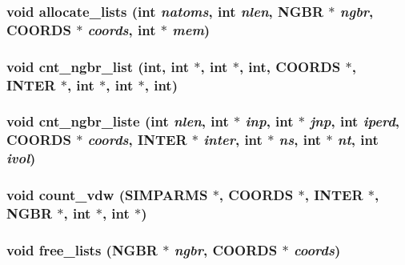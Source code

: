 \subsubsection{\setlength{\rightskip}{0pt plus 5cm}void allocate\_\-lists (int {\em natoms}, int {\em nlen}, {\bf NGBR} $\ast$ {\em ngbr}, {\bf COORDS} $\ast$ {\em coords}, int $\ast$ {\em mem})}\label{ngbr__list_8c_8540220cab7e209c3a9f81f034bc582f}


\subsubsection{\setlength{\rightskip}{0pt plus 5cm}void cnt\_\-ngbr\_\-list (int, int $\ast$, int $\ast$, int, {\bf COORDS} $\ast$, {\bf INTER} $\ast$, int $\ast$, int $\ast$, int)}\label{ngbr__list_8c_a7ae71e6c2af629ac14c7beeb62545df}


\subsubsection{\setlength{\rightskip}{0pt plus 5cm}void cnt\_\-ngbr\_\-liste (int {\em nlen}, int $\ast$ {\em inp}, int $\ast$ {\em jnp}, int {\em iperd}, {\bf COORDS} $\ast$ {\em coords}, {\bf INTER} $\ast$ {\em inter}, int $\ast$ {\em ns}, int $\ast$ {\em nt}, int {\em ivol})}\label{ngbr__list_8c_52df9fcf5aa2c6c4f15c0d26d7c3f9f9}


\subsubsection{\setlength{\rightskip}{0pt plus 5cm}void count\_\-vdw ({\bf SIMPARMS} $\ast$, {\bf COORDS} $\ast$, {\bf INTER} $\ast$, {\bf NGBR} $\ast$, int $\ast$, int $\ast$)}\label{ngbr__list_8c_e995108fed90ddc168088123e53052f4}


\subsubsection{\setlength{\rightskip}{0pt plus 5cm}void free\_\-lists ({\bf NGBR} $\ast$ {\em ngbr}, {\bf COORDS} $\ast$ {\em coords})}\label{ngbr__list_8c_8c8f4a96f8bcfad5ebdb95533ba417fe}


